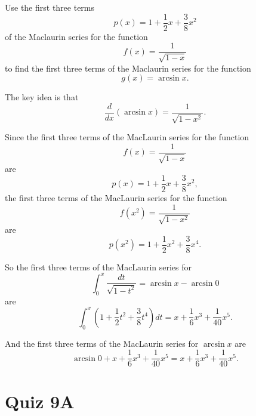 \documentclass{ximera}
\begin{document}
\begin{question} \label{QmWMr3490}

Use the first three terms 
\[
   p(x) =  1 + \frac{1}{2}x + \frac{3}{8}x^2
\]
of the Maclaurin series for the function
\[
   f(x) =  \frac{1}{\sqrt{1-x}} 
\]
to find the first three terms of the Maclaurin series for the function
\[
 g(x) = \arcsin x .
\]

\begin{explanation}
The key idea is that
\[
    \frac{d}{dx} \left(\arcsin x \right) = \frac{1}{\sqrt{1-x^2}}.
\]

Since the first three terms of the MacLaurin series for the function 
\[
    f(x) = \frac{1}{\sqrt{1-x}}
\]
are
\[
  p(x) =  1 + \frac{1}{2}x + \frac{3}{8}x^2,
\]
the first three terms of the MacLaurin series for the function
\[
    f(x^2) = \frac{1}{\sqrt{1-x^2}}
\]
are
\[
   p(x^2) = 1 + \frac{1}{2}x^2 + \frac{3}{8}x^4 .
\]

So the first three terms of the MacLaurin series for
\[
   \int_0^x \frac{dt}{\sqrt{1-t^2}} = \arcsin x - \arcsin 0
\]
are
\[
   \int_0^x \left( 1 + \frac{1}{2}t^2 + \frac{3}{8}t^4  \right) dt = x + \frac{1}{6}x^3 + \frac{1}{40}x^5 . 
\]

And the first three terms of the MacLaurin series for $\arcsin x$ are
\[
    \arcsin 0 + x + \frac{1}{6}x^3 + \frac{1}{40}x^5 = x + \frac{1}{6}x^3 + \frac{1}{40}x^5.
\]

\end{explanation}

\end{question}

\section{Quiz 9A}
\end{document}
